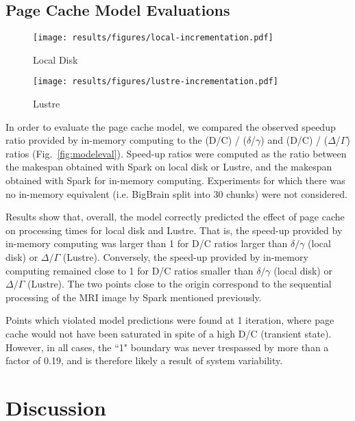 \documentclass{IEEEtran}
\begin{document}
\subsection{Page Cache Model Evaluations}
\begin{figure*}
\begin{subfigure}{0.5\linewidth}
\centering
    \texttt{[image: results/figures/local-incrementation.pdf]}
\caption{Local Disk}
\label{fig:modeleval-local}
    \end{subfigure}%
\begin{subfigure}{0.5\linewidth}
\centering
    \texttt{[image: results/figures/lustre-incrementation.pdf]}
\caption{Lustre}
\label{fig:modeleval-lustre}
\end{subfigure}
    \caption{Page cache model evaluation. Grey 
             regions denote areas that violate model predictions.}
\label{fig:modeleval}
\end{figure*}

In order to evaluate the page cache model, we compared the observed 
speedup ratio provided by in-memory computing to the (D/C) / 
($\delta$/$\gamma$) and (D/C) / ($\Delta$/$\Gamma$) ratios 
(Fig.~\ref{fig:modeleval}). Speed-up ratios were computed as the ratio 
between the makespan obtained with Spark on local disk or Lustre, and 
the makespan obtained with Spark for in-memory computing. Experiments 
for which there was no in-memory equivalent (i.e. BigBrain split into 
30 
chunks) 
were not considered.

Results show that, overall, the model correctly predicted the effect of 
page cache on processing times for local disk and Lustre. That is, the 
speed-up provided by in-memory computing was larger than 1 for D/C 
ratios larger than $\delta/\gamma$ (local disk) or $\Delta/\Gamma$ 
(Lustre). Conversely, the speed-up provided by in-memory computing 
remained close to 1 for D/C ratios smaller than $\delta/\gamma$ (local 
disk) or $\Delta/\Gamma$ (Lustre). The two points close to the origin 
correspond to the sequential processing of the MRI image by Spark 
mentioned previously.

Points which violated 
model predictions were found at 1 iteration, where page cache would not 
have been saturated in spite of a high D/C (transient state). However, 
in all cases, the ``1" boundary was never trespassed by more than a 
factor of 0.19, and is therefore likely a result of system variability.

\section{Discussion} %
\label{sec:discussion}
\end{document}
